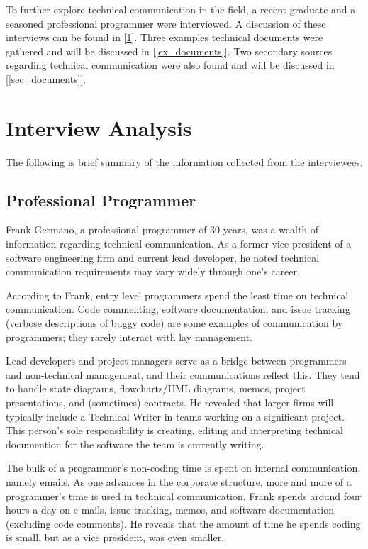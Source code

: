 \documentclass[prodmode,acmtecs]{acmsmall} %
\begin{document}
To further explore technical communication in the field, a recent graduate and a seasoned professional programmer were interviewed.  A discussion of these interviews can be found in [\ref{interviews}].  Three examples technical documents were gathered and will be discussed in [\ref{ex_documents}].  Two secondary sources regarding technical communication were also found and will be discussed in [\ref{sec_documents}].

\section{Interview Analysis}\label{interviews}
The following is brief summary of the information collected from the interviewees.
\subsection{Professional Programmer}
Frank Germano, a professional programmer of 30 years, was a wealth of information regarding technical communication.  As a former vice president of a software engineering firm and current lead developer, he noted technical communication requirements may vary widely through one's career. 

According to Frank, entry level programmers spend the least time on technical communication.  Code commenting, software documentation, and issue tracking (verbose descriptions of buggy code) are some examples of communication by programmers; they rarely interact with lay management.

Lead developers and project managers serve as a bridge between programmers and non-technical management, and their communications reflect this.  They tend to handle state diagrams, flowcharts/UML diagrams, memos, project presentations, and (sometimes) contracts.  He revealed that larger firms will typically include a Technical Writer in teams working on a significant project.  This person's sole responsibility is creating, editing and interpreting technical documention for the software the team is currently writing. 

The bulk of a programmer's non-coding time is spent on internal communication, namely emails.  As one advances in the corporate structure, more and more of a programmer's time is used in technical communication.  Frank spends around four hours a day on e-mails, issue tracking, memos, and software documentation (excluding code comments).  He reveals that the amount of time he spends coding is small, but as a vice president, was even smaller.
\end{document}
